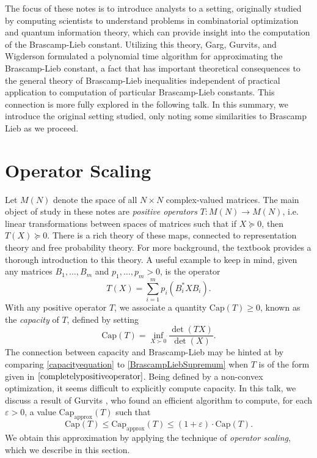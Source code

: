 \documentclass[12pt]{article}
\begin{document}
The focus of these notes is to introduce analysts to a setting, originally studied by computing scientists to understand problems in combinatorial optimization and quantum information theory, which can provide insight into the computation of the Brascamp-Lieb constant. Utilizing this theory, Garg, Gurvits, and Wigderson \cite{ggow} formulated a polynomial time algorithm for approximating the Brascamp-Lieb constant, a fact that has important theoretical consequences to the general theory of Brascamp-Lieb inequalities independent of practical application to computation of particular Brascamp-Lieb constants. This connection is more fully explored in the following talk. In this summary, we introduce the original setting studied, only noting some similarities to Brascamp Lieb as we proceed.

\section{Operator Scaling}

Let $M(N)$ denote the space of all $N \times N$ complex-valued matrices. The main object of study in these notes are \emph{positive operators} $T: M(N) \to M(N)$, i.e. linear transformations between spaces of matrices such that if $X \succeq 0$, then $T(X) \succeq 0$.  There is a rich theory of these maps, connected to representation theory and free probability theory. For more background, the textbook \cite{bhatia} provides a thorough introduction to this theory. A useful example to keep in mind, given any matrices $B_1,\dots, B_m$ and $p_1,\dots,p_m > 0$, is the operator
%
\begin{equation} \label{completelypositiveoperator}
    T(X) = \sum_{i = 1}^m p_i (B_i^* X B_i).
\end{equation}
%
With any positive operator $T$, we associate a quantity $\text{Cap}(T) \geq 0$, known as the \emph{capacity} of $T$, defined by setting
%
\begin{equation} \label{capacityequation}
    \text{Cap}(T) = \inf_{X \succ 0} \frac{\det(TX)}{\det(X)}.
\end{equation}
%
The connection between capacity and Brascamp-Lieb may be hinted at by comparing \eqref{capacityequation} to \eqref{BrascampLiebSupremum} when $T$ is of the form given in $\eqref{completelypositiveoperator}$. Being defined by a non-convex optimization, it seems difficult to explicitly compute capacity. In this talk, we discuss a result of Gurvits \cite{gurv2004}, who found an efficient algorithm to compute, for each $\varepsilon > 0$, a value $\text{Cap}_{\text{approx}}(T)$ such that
%
\[ \text{Cap}(T) \leq \text{Cap}_{\text{approx}}(T) \leq (1 + \varepsilon) \cdot \text{Cap}(T). \]
%
We obtain this approximation by applying the technique of \emph{operator scaling}, which we describe in this section.
\end{document}
